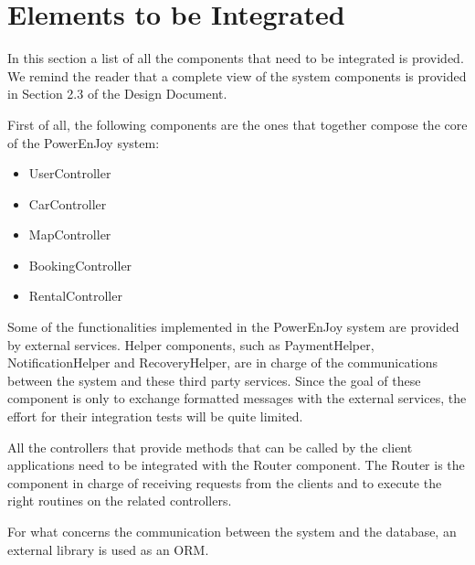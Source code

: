 
\section{Elements to be Integrated}
In this section a list of all the components that need to be integrated is provided. We remind the reader that a complete view of the system components is provided in Section 2.3 of the Design Document.

First of all, the following components are the ones that together compose the core of the PowerEnJoy system:

\begin{itemize}
	\item UserController
	\item CarController
	\item MapController
	\item BookingController
	\item RentalController
\end{itemize}

Some of the functionalities implemented in the PowerEnJoy system are provided by external services. Helper components, such as PaymentHelper, NotificationHelper and RecoveryHelper, are in charge of the communications between the system and these third party services. Since the goal of these component is only to exchange formatted messages with the external services, the effort for their integration tests will be quite limited.

All the controllers that provide methods that can be called by the client applications need to be integrated with the Router component. The Router is the component in charge of receiving requests from the clients and to execute the right routines on the related controllers.

For what concerns the communication between the system and the database, an external library is used as an ORM.
